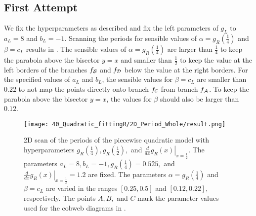 \subsection{First Attempt}

We fix the hyperparameters as described and fix the left parameters of $g_L$ to $a_L = 8$ and $b_L = -1$.
Scanning the periods for sensible values of $\alpha = g_R\left(\frac{1}{4}\right)$ and $\beta = c_L$ results in .
The sensible values of $\alpha = g_R\left(\frac{1}{4}\right)$ are larger than $\frac{1}{4}$ to keep the parabola above the bisector $y = x$ and smaller than $\frac{1}{2}$ to keep the value at the left borders of the branches $f_{\mathcal{B}}$ and $f_{\mathcal{D}}$ below the value at the right borders.
For the specified values of $a_L$ and $b_L$, the sensible values for $\beta = c_L$ are smaller than $0.22$ to not map the points directly onto branch $f_{\mathcal{C}}$ from branch $f_{\mathcal{A}}$.
To keep the parabola above the bisector $y = x$, the values for $\beta$ should also be larger than $0.12$.

\begin{figure}
	\centering
	\texttt{[image: 40\_Quadratic\_fittingR/2D\_Period\_Whole/result.png]}
	\caption[2D scan of the periods of the quadratic model with hyperparameters]{
	2D scan of the periods of the piecewise quadratic model with hyperparameters $g_R\left(\frac{1}{4}\right), g_R\left(\frac{1}{2}\right),$ and $\left. \frac{d}{dx} g_R\left(x\right) \right|_{x = \frac{1}{2}}$.
	The parameters $a_L = 8, b_L = -1, g_R\left(\frac{1}{4}\right) = 0.525,$ and $\left. \frac{d}{dx} g_R\left(x\right) \right|_{x = \frac{1}{2}} = 1.2$ are fixed.
	The parameters $\alpha = g_R\left(\frac{1}{4}\right)$ and $\beta = c_L$ are varied in the ranges $[0.25, 0.5]$ and $[0.12, 0.22]$, respectively.
	The points $A, B,$ and $C$ mark the parameter values used for the cobweb diagrams in .
	}
	\label{fig:setup.quad.hyper.1.period}
\end{figure}


